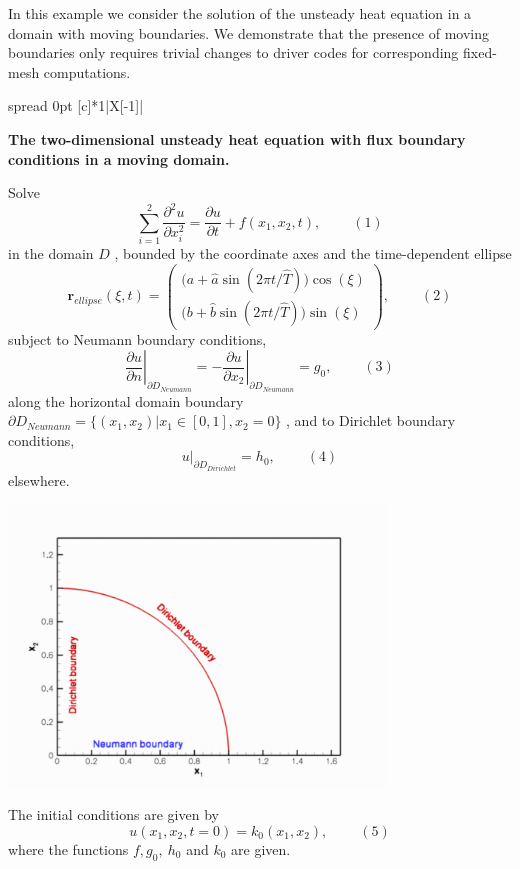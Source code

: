 In this example we consider the solution of the unsteady heat equation in a domain with moving boundaries. We demonstrate that the presence of moving boundaries only requires trivial changes to driver codes for corresponding fixed-\/mesh computations.

\begin{center} \tabulinesep=1mm
\begin{longtabu} spread 0pt [c]{*{1}{|X[-1]}|}
\hline
\begin{center} {\bfseries The two-\/dimensional unsteady heat equation with flux boundary conditions in a moving domain.} \end{center}  Solve \[ \sum_{i=1}^2\frac{\partial^2 u}{\partial x_i^2} = \frac{\partial u}{\partial t} + f\left(x_1,x_2,t\right), \ \ \ \ \ \ \ \ \ \ (1) \] in the domain $ D $ , bounded by the coordinate axes and the time-\/dependent ellipse \[ \mathbf{r}_{ellipse}(\xi,t) = \left( \begin{array}{c} \big( a+\hat{a}\sin(2\pi t/\hat{T}) \big) \cos(\xi) \\ \big( b+\hat{b}\sin(2\pi t/\hat{T}) \big) \sin(\xi) \end{array} \right), \ \ \ \ \ \ \ \ \ \ (2) \] subject to Neumann boundary conditions, \[ \left. \frac{\partial u}{\partial n}\right|_{\partial D_{Neumann}}= - \left. \frac{\partial u}{\partial x_2}\right|_{\partial D_{Neumann}}= g_0, \ \ \ \ \ \ \ \ \ \ (3) \] along the horizontal domain boundary $ \partial D_{Neumann} = \{ (x_1,x_2) | x_1 \in [0,1], x_2=0 \} $ , and to Dirichlet boundary conditions, \[ \left. u\right|_{\partial D_{Dirichlet}}=h_0, \ \ \ \ \ \ \ \ \ \ (4) \] elsewhere.  
\begin{DoxyImage}
\includegraphics[width=0.75\textwidth]{domain}
\end{DoxyImage}
 The initial conditions are given by \[ u(x_1,x_2,t=0)=k_0(x_1,x_2), \ \ \ \ \ \ \ \ \ \ (5) \] where the functions $ f, g_0, \ h_0 $ and $ k_0 $ are given.   \\
\end{longtabu}
\end{center} 

